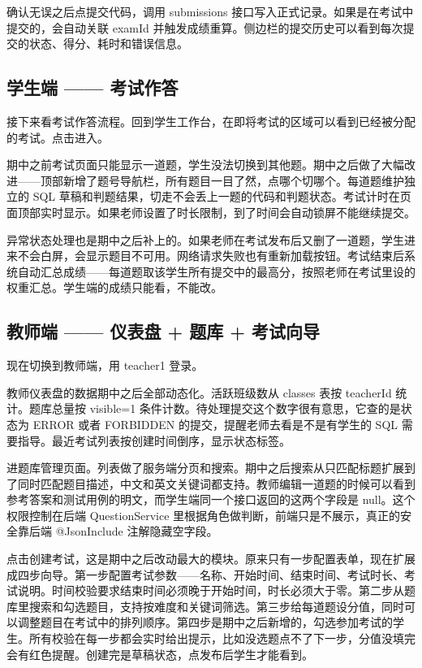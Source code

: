 \documentclass[12pt,a4paper]{article}
\begin{document}
确认无误之后点提交代码，调用 submissions 接口写入正式记录。如果是在考试中提交的，会自动关联 examId 并触发成绩重算。侧边栏的提交历史可以看到每次提交的状态、得分、耗时和错误信息。

\subsection*{学生端 —— 考试作答}

接下来看考试作答流程。回到学生工作台，在即将考试的区域可以看到已经被分配的考试。点击进入。

期中之前考试页面只能显示一道题，学生没法切换到其他题。期中之后做了大幅改进——顶部新增了题号导航栏，所有题目一目了然，点哪个切哪个。每道题维护独立的 SQL 草稿和判题结果，切走不会丢上一题的代码和判题状态。考试计时在页面顶部实时显示。如果老师设置了时长限制，到了时间会自动锁屏不能继续提交。

异常状态处理也是期中之后补上的。如果老师在考试发布后又删了一道题，学生进来不会白屏，会显示题目不可用。网络请求失败也有重新加载按钮。考试结束后系统自动汇总成绩——每道题取该学生所有提交中的最高分，按照老师在考试里设的权重汇总。学生端的成绩只能看，不能改。

\subsection*{教师端 —— 仪表盘 + 题库 + 考试向导}

现在切换到教师端，用 teacher1 登录。

教师仪表盘的数据期中之后全部动态化。活跃班级数从 classes 表按 teacherId 统计。题库总量按 visible=1 条件计数。待处理提交这个数字很有意思，它查的是状态为 ERROR 或者 FORBIDDEN 的提交，提醒老师去看是不是有学生的 SQL 需要指导。最近考试列表按创建时间倒序，显示状态标签。

进题库管理页面。列表做了服务端分页和搜索。期中之后搜索从只匹配标题扩展到了同时匹配题目描述，中文和英文关键词都支持。教师编辑一道题的时候可以看到参考答案和测试用例的明文，而学生端同一个接口返回的这两个字段是 null。这个权限控制在后端 QuestionService 里根据角色做判断，前端只是不展示，真正的安全靠后端 @JsonInclude 注解隐藏空字段。

点击创建考试，这是期中之后改动最大的模块。原来只有一步配置表单，现在扩展成四步向导。第一步配置考试参数——名称、开始时间、结束时间、考试时长、考试说明。时间校验要求结束时间必须晚于开始时间，时长必须大于零。第二步从题库里搜索和勾选题目，支持按难度和关键词筛选。第三步给每道题设分值，同时可以调整题目在考试中的排列顺序。第四步是期中之后新增的，勾选参加考试的学生。所有校验在每一步都会实时给出提示，比如没选题点不了下一步，分值没填完会有红色提醒。创建完是草稿状态，点发布后学生才能看到。
\end{document}
